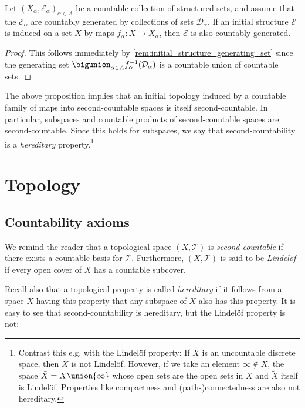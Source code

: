 \documentclass[article, a4paper, 11pt, oneside]{memoir}
\numberwithin{equation}{chapter}
\newcommand{\calT}{\mathcal{T}}
\newcommand{\calE}{\mathcal{E}}
\newcommand{\calD}{\mathcal{D}}
\begin{document}
\begin{proposition}
    Let $(X_\alpha,\calE_\alpha)_{\alpha \in A}$ be a countable collection of structured sets, and assume that the $\calE_\alpha$ are countably generated by collections of sets $\calD_\alpha$. If an initial structure $\calE$ is induced on a set $X$ by maps $f_\alpha \colon X \to X_\alpha$, then $\calE$ is also countably generated.
\end{proposition}

\begin{proof}
    This follows immediately by \cref{rem:initial_structure_generating_set} since the generating set $\bigunion_{\alpha \in A} f_\alpha^{-1}(\calD_\alpha)$ is a countable union of countable sets.
\end{proof}


\begin{examplebreak}
    The above proposition implies that an initial topology induced by a countable family of maps into second-countable spaces is itself second-countable. In particular, subspaces and countable products of second-countable spaces are second-countable. Since this holds for subspaces, we say that second-countability is a \emph{hereditary} property.\footnote{Contrast this e.g. with the Lindelöf property: If $X$ is an uncountable discrete space, then $X$ is not Lindelöf. However, if we take an element $\infty \not\in X$, the space $\tilde X = X \union \{\infty\}$ whose open sets are the open sets in $X$ and $\tilde X$ itself is Lindelöf. Properties like compactness and (path-)connectedness are also not hereditary.}
\end{examplebreak}



\chapter{Topology}

\section{Countability axioms}

We remind the reader that a topological space $(X, \calT)$ is \emph{second-countable} if there exists a countable basis for $\calT$. Furthermore, $(X, \calT)$ is said to be \emph{Lindelöf} if every open cover of $X$ has a countable subcover.

Recall also that a topological property is called \emph{hereditary} if it follows from a space $X$ having this property that any subspace of $X$ also has this property. It is easy to see that second-countability is hereditary, but the Lindelöf property is not:
\end{document}
